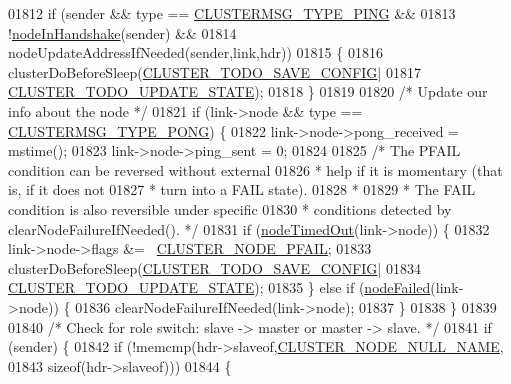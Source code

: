 \begin{DoxyCode}
{{{{{{{{{{{{{{{{{{{{{{{{{{{{{{01812         \textcolor{keywordflow}{if} (sender && type == \hyperlink{cluster_8h_aeb8a936505e22f64e5039523a3c96d4c}{CLUSTERMSG\_TYPE\_PING} &&
01813             !\hyperlink{cluster_8h_a70f1a5bb82f54ce5d17b13de42176790}{nodeInHandshake}(sender) &&
01814             nodeUpdateAddressIfNeeded(sender,link,hdr))
01815         \{
01816             clusterDoBeforeSleep(\hyperlink{cluster_8h_a0ae5ff08fbae3c655012b4de8bfc327d}{CLUSTER\_TODO\_SAVE\_CONFIG}|
01817                                  \hyperlink{cluster_8h_abea0d393cba342261e4a7e6fb745f388}{CLUSTER\_TODO\_UPDATE\_STATE});
01818         \}
01819 
01820         \textcolor{comment}{/* Update our info about the node */}
01821         \textcolor{keywordflow}{if} (link->node && type == \hyperlink{cluster_8h_a33e9439f462f28177a31dfc74de0c16b}{CLUSTERMSG\_TYPE\_PONG}) \{
01822             link->node->pong\_received = mstime();
01823             link->node->ping\_sent = 0;
01824 
01825             \textcolor{comment}{/* The PFAIL condition can be reversed without external}
01826 \textcolor{comment}{             * help if it is momentary (that is, if it does not}
01827 \textcolor{comment}{             * turn into a FAIL state).}
01828 \textcolor{comment}{             *}
01829 \textcolor{comment}{             * The FAIL condition is also reversible under specific}
01830 \textcolor{comment}{             * conditions detected by clearNodeFailureIfNeeded(). */}
01831             \textcolor{keywordflow}{if} (\hyperlink{cluster_8h_ac0ab1cbdbc2a49b30c98d73640476e32}{nodeTimedOut}(link->node)) \{
01832                 link->node->flags &= ~\hyperlink{cluster_8h_a5306c1ae8988b8be0a1a02bd9162dfa1}{CLUSTER\_NODE\_PFAIL};
01833                 clusterDoBeforeSleep(\hyperlink{cluster_8h_a0ae5ff08fbae3c655012b4de8bfc327d}{CLUSTER\_TODO\_SAVE\_CONFIG}|
01834                                      \hyperlink{cluster_8h_abea0d393cba342261e4a7e6fb745f388}{CLUSTER\_TODO\_UPDATE\_STATE});
01835             \} \textcolor{keywordflow}{else} \textcolor{keywordflow}{if} (\hyperlink{cluster_8h_a6a31c614ff4f5ac8ebaa630b0a921c3d}{nodeFailed}(link->node)) \{
01836                 clearNodeFailureIfNeeded(link->node);
01837             \}
01838         \}
01839 
01840         \textcolor{comment}{/* Check for role switch: slave -> master or master -> slave. */}
01841         \textcolor{keywordflow}{if} (sender) \{
01842             \textcolor{keywordflow}{if} (!memcmp(hdr->slaveof,\hyperlink{cluster_8h_ac8300cbcbca7ec5ef6a3afde258204e6}{CLUSTER\_NODE\_NULL\_NAME},
01843                 \textcolor{keyword}{sizeof}(hdr->slaveof)))
01844             \{
}}}}}}}}}}}}}}}}}}}}}}}}}}}}}}
\end{DoxyCode}
